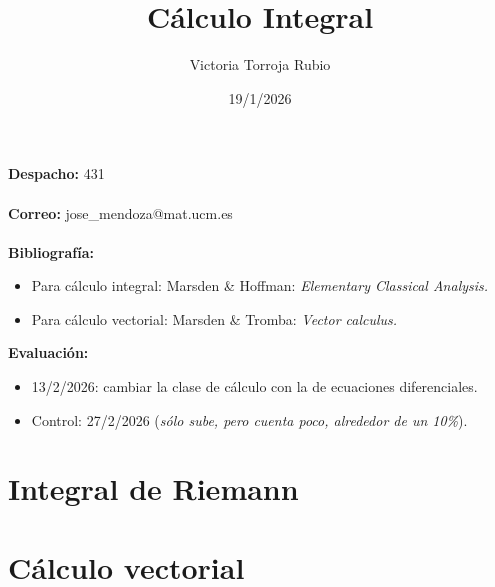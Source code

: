 \documentclass{report}
\begin{document}
\title{Cálculo Integral}
\author{Victoria Torroja Rubio}
\date{19/1/2026}

\maketitle

\tableofcontents

\pagebreak

\textbf{Despacho:} 431 \\ \\
\textbf{Correo:} jose\_mendoza@mat.ucm.es\\ \\
\textbf{Bibliografía:} 
\begin{itemize}
	\item Para cálculo integral: Marsden \& Hoffman: \textit{Elementary Classical Analysis.}
	\item Para cálculo vectorial: Marsden \& Tromba: \textit{Vector calculus.}
\end{itemize}
\textbf{Evaluación:} 
\begin{itemize}
	\item 13/2/2026: cambiar la clase de cálculo con la de ecuaciones diferenciales. 
	\item Control: 27/2/2026 (\textit{sólo sube, pero cuenta poco, alrededor de un 10\%}).
\end{itemize}

\part{Integral de Riemann}



\part{Cálculo vectorial}


\end{document}

